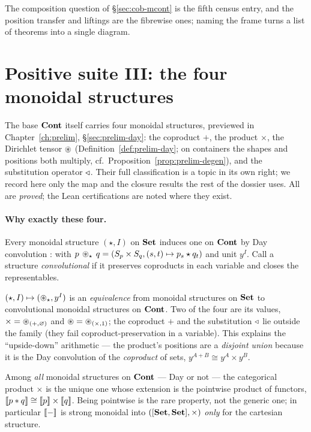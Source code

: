 The composition question of \S\ref{sec:cob-mcont} is the fifth census entry, and
the position transfer and liftings are the fibrewise ones; naming the frame turns
a list of theorems into a single diagram.

\section{Positive suite III: the four monoidal structures}
\label{sec:cob-four}

The base $\mathbf{Cont}$ itself carries four monoidal structures, previewed in
Chapter~\ref{ch:prelim}, \S\ref{sec:prelim-day}: the coproduct $+$, the product
$\times$, the Dirichlet tensor $\circledast$ (Definition~\ref{def:prelim-day}; on
containers the shapes and positions both multiply, cf.\
Proposition~\ref{prop:prelim-degen}), and the substitution operator $\triangleleft$. Their
full classification is a topic in its own right; we record here only the map and
the closure results the rest of the dossier uses. All are \emph{proved}; the Lean
certifications are noted where they exist.

\paragraph{Why exactly these four.} Every monoidal structure $(\star,I)$ on $\mathbf{Set}$
induces one on $\mathbf{Cont}$ by Day convolution \cite{day1970,NiuSpivak}: with
$p\,\circledast_\star\,q=(S_p\times S_q,(s,t)\mapsto p_s\star q_t)$ and unit $y^{I}$.
Call a structure \emph{convolutional} if it preserves coproducts in each variable
and closes the representables.

\begin{theorem}\label{thm:cob-dayclass}
$(\star,I)\mapsto(\circledast_\star,y^{I})$ is an \emph{equivalence} from monoidal
structures on $\mathbf{Set}$ to convolutional monoidal structures on $\mathbf{Cont}$. Two of the
four are its values, $\times=\circledast_{(+,\varnothing)}$ and
$\circledast=\circledast_{(\times,1)}$; the coproduct $+$ and the substitution $\triangleleft$ lie
outside the family (they fail coproduct-preservation in a variable). This
explains the ``upside-down'' arithmetic --- the product's positions are a
\emph{disjoint union} because it is the Day convolution of the \emph{coproduct} of
sets, $y^{A+B}\cong y^{A}\times y^{B}$.
\end{theorem}

\begin{theorem}[Pointwise $=$ product; \emph{proved}]\label{thm:cob-pointwise}
Among \emph{all} monoidal structures on $\mathbf{Cont}$ --- Day or not --- the categorical
product $\times$ is the unique one whose extension is the pointwise product of
functors, $\llbracket p\ast q \rrbracket\cong\llbracket p \rrbracket\times\llbracket q \rrbracket$. Being pointwise is the rare
property, not the generic one; in particular $\llbracket - \rrbracket$ is strong monoidal into
$([\mathbf{Set},\mathbf{Set}],\times)$ \emph{only} for the cartesian structure.
\end{theorem}

